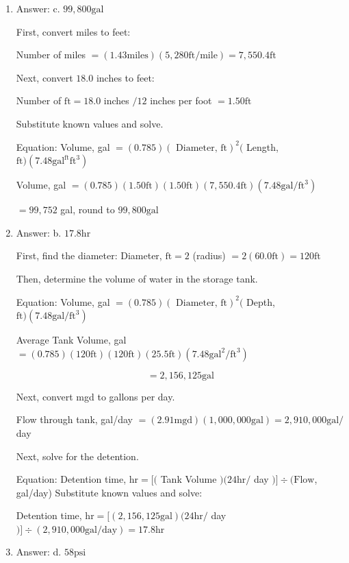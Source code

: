 \documentclass[10pt]{article}
\begin{document}
\begin{enumerate}
  \item Answer: c. $99,800 \mathrm{gal}$

First, convert miles to feet:

Number of miles $=(1.43 \mathrm{miles})(5,280 \mathrm{ft} / \mathrm{mile})=7,550.4 \mathrm{ft}$

Next, convert $18.0$ inches to feet:

Number of $\mathrm{ft}=18.0$ inches $/ 12$ inches per foot $=1.50 \mathrm{ft}$

Substitute known values and solve.

Equation: Volume, gal $=(0.785)(\text { Diameter, } \mathrm{ft})^{2}($ Length, $\mathrm{ft})\left(7.48 \mathrm{gal}^{\mathrm{ft}} \mathrm{ft}^{3}\right)$

Volume, gal $=(0.785)(1.50 \mathrm{ft})(1.50 \mathrm{ft})(7,550.4 \mathrm{ft})\left(7.48 \mathrm{gal} / \mathrm{ft}^{3}\right)$

$=99,752$ gal, round to $99,800 \mathrm{gal}$

  \item Answer: b. $17.8 \mathrm{hr}$

First, find the diameter: Diameter, $\mathrm{ft}=2$ (radius) $=2(60.0 \mathrm{ft})=120 \mathrm{ft}$

Then, determine the volume of water in the storage tank.

Equation: Volume, gal $=(0.785)(\text { Diameter, } \mathrm{ft})^{2}($ Depth, $\mathrm{ft})\left(7.48 \mathrm{gal} / \mathrm{ft}^{3}\right)$

Average Tank Volume, gal $=(0.785)(120 \mathrm{ft})(120 \mathrm{ft})(25.5 \mathrm{ft})\left(7.48 \mathrm{gal}^{2} / \mathrm{ft}^{3}\right)$

$$
=2,156,125 \mathrm{gal}
$$

Next, convert mgd to gallons per day.

Flow through tank, gal/day $=(2.91 \mathrm{mgd})(1,000,000 \mathrm{gal})=2,910,000 \mathrm{gal} /$ day

Next, solve for the detention.

Equation: Detention time, $\mathrm{hr}=[($ Tank Volume $)(24 \mathrm{hr} /$ day $)] \div(\mathrm{Flow}$, gal/day) Substitute known values and solve:

Detention time, $\mathrm{hr}=[(2,156,125 \mathrm{gal})(24 \mathrm{hr} /$ day $)] \div(2,910,000 \mathrm{gal} / \mathrm{day})=17.8 \mathrm{hr}$

  \item Answer: d. $58 \mathrm{psi}$


\end{enumerate}
\end{document}
